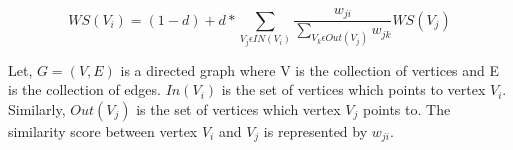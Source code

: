 \begin{equation}
\label{eq:textrank}
    WS(V_i) = (1 - d) + d * \sum_{V_j\epsilon IN(V_i) } \frac{w_{ji}}{\sum_{V_k \epsilon Out(V_j)} w_{jk}}  WS(V_j)
\end{equation}

Let, $ G = (V, E)$ is a directed graph where V is the collection of vertices and E is the collection of edges. $In(V_i)$ is the set of vertices which points to vertex $V_i$. Similarly, $Out(V_j)$ is the set of vertices which vertex $V_j$ points to. The similarity score between vertex $V_i$ and $V_j$ is represented by $w_{ji}$. 






